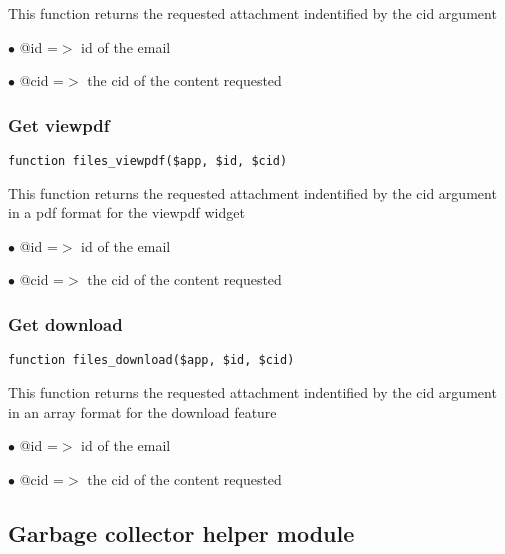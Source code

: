 \documentclass[a4paper]{article}
\begin{document}
This function returns the requested attachment indentified by the cid argument

\begin{compactitem}
\item[\color{myblue}$\bullet$] @id  =$>$ id of the email
\item[\color{myblue}$\bullet$] @cid =$>$ the cid of the content requested
\end{compactitem}

\hypertarget{toc449}{}
\subsubsection{Get viewpdf}

\begin{lstlisting}
function files_viewpdf($app, $id, $cid)
\end{lstlisting}

This function returns the requested attachment indentified by the cid argument
in a pdf format for the viewpdf widget

\begin{compactitem}
\item[\color{myblue}$\bullet$] @id  =$>$ id of the email
\item[\color{myblue}$\bullet$] @cid =$>$ the cid of the content requested
\end{compactitem}

\hypertarget{toc450}{}
\subsubsection{Get download}

\begin{lstlisting}
function files_download($app, $id, $cid)
\end{lstlisting}

This function returns the requested attachment indentified by the cid argument
in an array format for the download feature

\begin{compactitem}
\item[\color{myblue}$\bullet$] @id  =$>$ id of the email
\item[\color{myblue}$\bullet$] @cid =$>$ the cid of the content requested
\end{compactitem}

\hypertarget{toc451}{}
\subsection{Garbage collector helper module}
\end{document}
